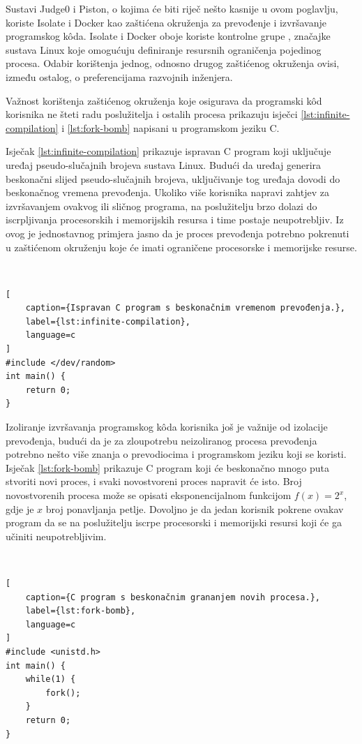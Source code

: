 \documentclass[times, utf8, diplomski]{fer}
\begin{document}
Sustavi Judge0 i Piston, o kojima će biti riječ nešto kasnije u ovom poglavlju, koriste Isolate \citep{marevs2012new} i Docker \citep{merkel2014docker} kao zaštićena okruženja za prevođenje i izvršavanje programskog kôda. Isolate i Docker oboje koriste kontrolne grupe , značajke sustava Linux koje omogućuju definiranje resursnih ograničenja pojedinog procesa. Odabir korištenja jednog, odnosno drugog zaštićenog okruženja ovisi, između ostalog, o preferencijama razvojnih inženjera.

Važnost korištenja zaštićenog okruženja koje osigurava da programski kôd korisnika ne šteti radu poslužitelja i ostalih procesa prikazuju isječci \ref{lst:infinite-compilation} i \ref{lst:fork-bomb} napisani u programskom jeziku C. 

Isječak \ref{lst:infinite-compilation} prikazuje ispravan C program koji uključuje uređaj pseudo-slučajnih brojeva sustava Linux. Budući da uređaj generira beskonačni slijed pseudo-slučajnih brojeva, uključivanje tog uređaja dovodi do beskonačnog vremena prevođenja. Ukoliko više korisnika napravi zahtjev za izvršavanjem ovakvog ili sličnog programa, na poslužitelju brzo dolazi do iscrpljivanja procesorskih i memorijskih resursa i time postaje neupotrebljiv. Iz ovog je jednostavnog primjera jasno da je proces prevođenja potrebno pokrenuti u zaštićenom okruženju koje će imati ograničene procesorske i memorijske resurse.

\

\begin{lstlisting}[
    caption={Ispravan C program s beskonačnim vremenom prevođenja.},
    label={lst:infinite-compilation},
    language=c
]
#include </dev/random>
int main() {
    return 0;
}
\end{lstlisting}

Izoliranje izvršavanja programskog kôda korisnika još je važnije od izolacije prevođenja, budući da je za zloupotrebu neizoliranog procesa prevođenja potrebno nešto više znanja o prevodiocima i programskom jeziku koji se koristi. Isječak \ref{lst:fork-bomb} prikazuje C program koji će beskonačno mnogo puta stvoriti novi proces, i svaki novostvoreni proces napravit će isto. Broj novostvorenih procesa može se opisati eksponencijalnom funkcijom $f(x) = 2^x$, gdje je $x$ broj ponavljanja petlje. Dovoljno je da jedan korisnik pokrene ovakav program da se na poslužitelju iscrpe procesorski i memorijski resursi koji će ga učiniti neupotrebljivim.

\

\begin{lstlisting}[
    caption={C program s beskonačnim grananjem novih procesa.},
    label={lst:fork-bomb},
    language=c
]
#include <unistd.h>
int main() {
    while(1) {
        fork();
    }
    return 0;
}
\end{lstlisting}
\end{document}
